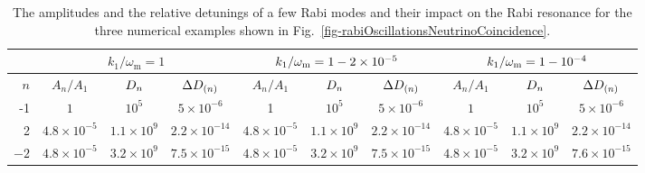 
\begin{table}
\centering
\scriptsize
\setlength\tabcolsep{2pt}
\begin{tabular}{r|ccc|ccc|ccc}
\hline
\hline
\multicolumn{1}{r|}{} & \multicolumn{3}{c|}{$k_1/\omega_{\mathrm m}=1$} & \multicolumn{3}{c|}{$k_1/\omega_\mathrm m=1-2\times 10^{-5}$} & \multicolumn{3}{c}{$k_1/\omega_\mathrm m=1-10^{-4}$} \\
\hline
   $n$ & $A_n/A_1$ & $D_n$  & $\Delta D_{(n)}$  & $A_n/A_1$ & $D_n$  & $\Delta D_{(n)}$  & $A_n/A_1$ & $D_n$  & $\Delta D_{(n)}$   \\
\hline
 -1 &	$1$  & $10^5$ &   $5\times 10^{-6}$   & 1 &	$10^{5}$ &  $5\times 10^{-6}$    &	$1$ &  $10^{5}$ & $5\times 10^{-6}$   \\
 2 & $4.8 \times 10^{-5}$ & $1.1 \times 10^{9}$ & $2.2\times 10^{-14}$  & $4.8 \times 10^{-5}$ & $1.1\times 10^9$ & $2.2\times 10^{-14}$ &  $4.8 \times 10^{-5}$ & $1.1\times 10^9$ & $2.2\times 10^{-14}$ \\
 $-2$ &  $4.8 \times 10^{-5}$ & $3.2\times 10^{9}$ & $7.5\times 10^{-15}$  &  $4.8 \times 10^{-5}$ & $3.2\times 10^{9}$ & $7.5\times 10^{-15}$ &   $4.8 \times 10^{-5}$ & $3.2\times 10^{9}$ & $7.6\times 10^{-15}$ \\
\hline
\hline
\end{tabular}
\caption{\label{table:relative-detunings-single-frequency-example}The amplitudes and the relative detunings of a few Rabi modes and their impact on the Rabi resonance for the three numerical examples shown in Fig.~\ref{fig-rabiOscillationsNeutrinoCoincidence}.}
\end{table}


